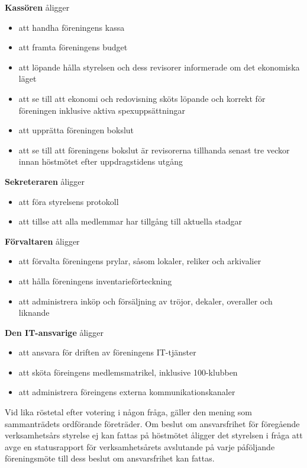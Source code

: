 \documentclass[a4paper]{article}
\begin{document}
\noindent
\textbf{Kassören} åligger

\begin{itemize}
  \item att handha föreningens kassa
  \item att framta föreningens budget
  \item att löpande hålla styrelsen och dess revisorer informerade om det ekonomiska läget
  \item att se till att ekonomi och redovisning sköts löpande och korrekt för föreningen inklusive aktiva spexuppsättningar
  \item att upprätta föreningen bokslut
  \item att se till att föreningens bokslut är revisorerna tillhanda senast tre veckor innan höstmötet efter uppdragstidens utgång
\end{itemize}

\noindent
\textbf{Sekreteraren} åligger

\begin{itemize}
  \item att föra styrelsens protokoll
  \item att tillse att alla medlemmar har tillgång till aktuella stadgar
\end{itemize}

\noindent
\textbf{Förvaltaren} åligger

\begin{itemize}
  \item att förvalta föreningens prylar, såsom lokaler, reliker och arkivalier
  \item att hålla föreningens inventarieförteckning
  \item att administrera inköp och försäljning av tröjor, dekaler, overaller och liknande
\end{itemize}

\noindent
\textbf{Den IT-ansvarige} åligger

\begin{itemize}
  \item att ansvara för driften av föreningens IT-tjänster
  \item att sköta föreingens medlemsmatrikel, inklusive 100-klubben
  \item att administrera föreingens externa kommunikationskanaler
\end{itemize}

\noindent
Vid lika röstetal efter votering i någon fråga, gäller den mening som sammanträdets ordförande företräder.\newline
\newline
Om beslut om ansvarsfrihet för föregående verksamhetsårs styrelse ej kan fattas på höstmötet åligger det styrelsen i fråga att avge en statusrapport för verksamhetsårets avslutande på varje påföljande föreningsmöte till dess beslut om ansvarsfrihet kan fattas.\newline
\end{document}
